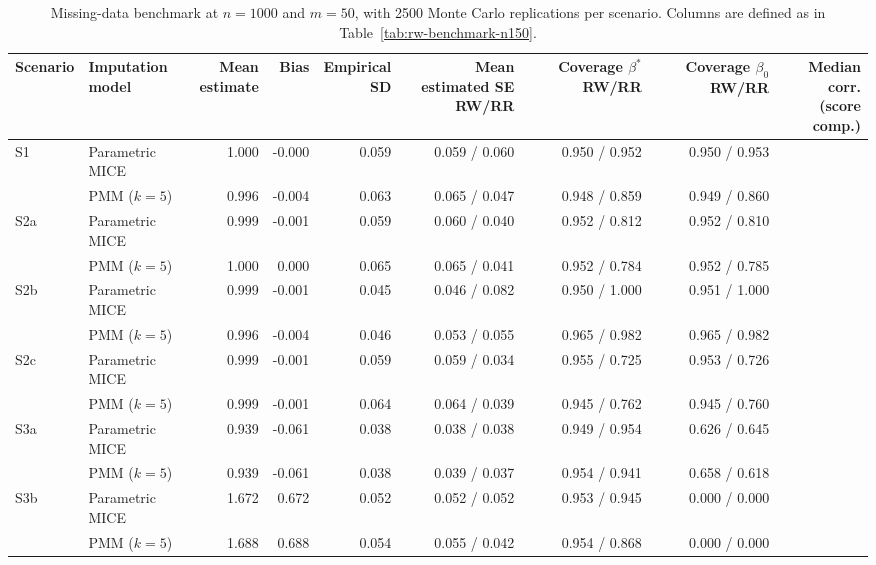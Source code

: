 \begin{table}[ht]
\centering
\scriptsize
\setlength{\tabcolsep}{3.5pt}
\begin{tabular}{llrrrrrrr}
\toprule
Scenario & \makecell{Imputation\\model} & \makecell{Mean\\estimate} & Bias &
\makecell{Empirical\\SD} &
\makecell{Mean estimated SE\\RW/RR} &
\makecell{Coverage \(\beta^\ast\)\\RW/RR} &
\makecell{Coverage \(\beta_0\)\\RW/RR} & \makecell{Median corr.\\(score comp.)}\\
\midrule
S1  & Parametric MICE & 1.000 & -0.000 & 0.059 & 0.059 / 0.060 & 0.950 / 0.952 & 0.950 / 0.953 &\\
\addlinespace[1pt]
    & PMM (\(k=5\)) & 0.996 & -0.004 & 0.063 & 0.065 / 0.047 & 0.948 / 0.859 & 0.949 / 0.860 &\\
\addlinespace[1pt]
S2a & Parametric MICE & 0.999 & -0.001 & 0.059 & 0.060 / 0.040 & 0.952 / 0.812 & 0.952 / 0.810 &\\
\addlinespace[1pt]
    & PMM (\(k=5\)) & 1.000 & 0.000 & 0.065 & 0.065 / 0.041 & 0.952 / 0.784 & 0.952 / 0.785 &\\
\addlinespace[1pt]
S2b & Parametric MICE & 0.999 & -0.001 & 0.045 & 0.046 / 0.082 & 0.950 / 1.000 & 0.951 / 1.000 &\\
\addlinespace[1pt]
    & PMM (\(k=5\)) & 0.996 & -0.004 & 0.046 & 0.053 / 0.055 & 0.965 / 0.982 & 0.965 / 0.982 &\\
\addlinespace[1pt]
S2c & Parametric MICE & 0.999 & -0.001 & 0.059 & 0.059 / 0.034 & 0.955 / 0.725 & 0.953 / 0.726 &\\
\addlinespace[1pt]
    & PMM (\(k=5\)) & 0.999 & -0.001 & 0.064 & 0.064 / 0.039 & 0.945 / 0.762 & 0.945 / 0.760 &\\
\addlinespace[1pt]
S3a & Parametric MICE & 0.939 & -0.061 & 0.038 & 0.038 / 0.038 & 0.949 / 0.954 & 0.626 / 0.645 &\\
\addlinespace[1pt]
    & PMM (\(k=5\)) & 0.939 & -0.061 & 0.038 & 0.039 / 0.037 & 0.954 / 0.941 & 0.658 / 0.618 &\\
\addlinespace[1pt]
S3b & Parametric MICE & 1.672 & 0.672  & 0.052 & 0.052 / 0.052 & 0.953 / 0.945 & 0.000 / 0.000 &\\
\addlinespace[1pt]
    & PMM (\(k=5\)) & 1.688 & 0.688 & 0.054 & 0.055 / 0.042 & 0.954 / 0.868 & 0.000 / 0.000 &\\
\bottomrule
\end{tabular}
\caption{Missing-data benchmark at \(n=1000\) and \(m=50\), with 2500
Monte Carlo replications per scenario.  Columns are defined as in
Table~\ref{tab:rw-benchmark-n150}.}
\label{tab:rw-benchmark-n1000}
\end{table}

